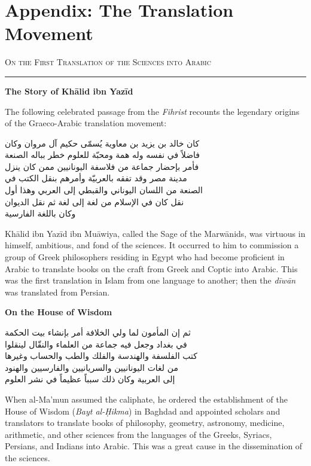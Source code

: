 \documentclass[11pt,a4paper]{article}
\newcommand{\ar}[1]{{\arabicfont\beginR #1\endR}}
\newcommand{\bilingual}[2]{%
  \noindent
  \begin{minipage}[t]{0.47\textwidth}
    \vspace{0pt}
    \begin{flushright}
    {\arabicfont\beginR #1\endR}
    \end{flushright}
  \end{minipage}%
  \hfill\vline\hfill
  \begin{minipage}[t]{0.47\textwidth}
    \vspace{0pt}
    #2
  \end{minipage}%
  \par\vspace{0.8em}
}
\newcommand{\bilingualsection}[2]{%
  \vspace{1em}%
  \noindent
  \begin{minipage}[t]{0.47\textwidth}
    \begin{flushright}
    \textsc{\color{sectioncolor}\ar{#1}}
    \end{flushright}
  \end{minipage}%
  \hfill
  \begin{minipage}[t]{0.47\textwidth}
    \textsc{\color{sectioncolor}#2}
  \end{minipage}%
  \par\vspace{0.5em}\hrule\vspace{0.8em}%
}
\newcommand{\bilingualsubsection}[2]{%
  \vspace{0.6em}%
  \noindent
  \begin{minipage}[t]{0.47\textwidth}
    \begin{flushright}
    \textbf{\color{sectioncolor}\ar{#1}}
    \end{flushright}
  \end{minipage}%
  \hfill
  \begin{minipage}[t]{0.47\textwidth}
    \textbf{\color{sectioncolor}#2}
  \end{minipage}%
  \par\vspace{0.4em}%
}
\begin{document}
\section*{Appendix: The Translation Movement}

\bilingualsection{في أول نقل العلوم إلى العربية}{On the First Translation of the Sciences into Arabic}

\bilingualsubsection{قصة خالد بن يزيد}{The Story of Kh\=alid ibn Yaz\=id}

The following celebrated passage from the \textit{Fihrist} recounts the
legendary origins of the Graeco-Arabic translation movement:

\vspace{0.5em}
\bilingual
{كان خالد بن يزيد بن معاوية يُسمّى حكيم آل مروان وكان\\
فاضلاً في نفسه وله همة ومحبّة للعلوم خطر بباله الصنعة\\
فأمر بإحضار جماعة من فلاسفة اليونانيين ممن كان ينزل\\
مدينة مصر وقد تفقه بالعربيّة وأمرهم بنقل الكتب في\\
الصنعة من اللسان اليوناني والقبطي إلى العربي وهذا أول\\
نقل كان في الإسلام من لغة إلى لغة ثم نقل الديوان\\
وكان باللغة الفارسية}
{Kh\=alid ibn Yaz\=id ibn Mu\=awiya, called the Sage of the Marw\=anids,
was virtuous in himself, ambitious, and fond of the sciences. It occurred
to him to commission a group of Greek philosophers residing in Egypt who
had become proficient in Arabic to translate books on the craft from Greek
and Coptic into Arabic. This was the first translation in Islam from one
language to another; then the \textit{d\=iw\=an} was translated from Persian.}

\vspace{0.5em}
\bilingualsubsection{في بيت الحكمة}{On the House of Wisdom}

\bilingual
{ثم إن المأمون لما ولي الخلافة أمر بإنشاء بيت الحكمة\\
في بغداد وجعل فيه جماعة من العلماء والنقّال لينقلوا\\
كتب الفلسفة والهندسة والفلك والطب والحساب وغيرها\\
من لغات اليونانيين والسريانيين والفارسيين والهنود\\
إلى العربية وكان ذلك سبباً عظيماً في نشر العلوم}
{When al-Ma'mun assumed the caliphate, he ordered the establishment of
the House of Wisdom (\textit{Bayt al-\d{H}ikma}) in Baghdad and appointed
scholars and translators to translate books of philosophy, geometry,
astronomy, medicine, arithmetic, and other sciences from the languages of
the Greeks, Syriacs, Persians, and Indians into Arabic. This was a great
cause in the dissemination of the sciences.}
\end{document}
